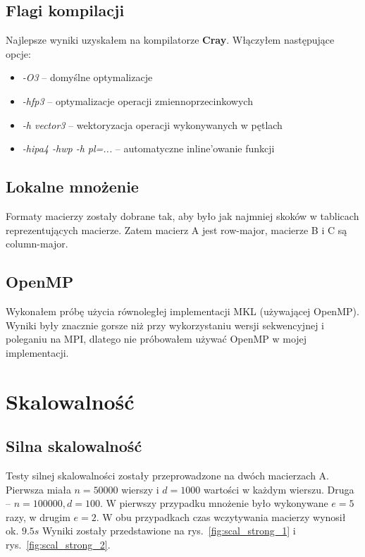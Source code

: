 \documentclass{article}
\begin{document}
\subsection{Flagi kompilacji}
Najlepsze wyniki uzyskałem na kompilatorze \textbf{Cray}. Włączyłem następujące opcje:
\begin{itemize}
  \item \emph{-O3} -- domyślne optymalizacje
  \item \emph{-hfp3} -- optymalizacje operacji zmiennoprzecinkowych
  \item \emph{-h vector3} -- wektoryzacja operacji wykonywanych w pętlach
  \item \emph{-hipa4 -hwp -h pl=...} -- automatyczne inline'owanie funkcji
\end{itemize}

\subsection{Lokalne mnożenie}
Formaty macierzy zostały dobrane tak, aby było jak najmniej skoków w tablicach reprezentujących macierze.
Zatem macierz A jest row-major, macierze B i C są column-major.

\subsection{OpenMP}
Wykonałem próbę użycia równoległej implementacji MKL (używającej OpenMP). Wyniki były znacznie gorsze niż przy
wykorzystaniu wersji sekwencyjnej i poleganiu na MPI, dlatego nie próbowałem używać OpenMP w mojej implementacji.

\section{Skalowalność}

\subsection{Silna skalowalność}

Testy silnej skalowalności zostały przeprowadzone na dwóch macierzach A. 
Pierwsza miała $n=50000$ wierszy i $d=1000$ wartości w każdym wierszu. Druga -- $n=100000, d=100$.
W pierwszy przypadku mnożenie było wykonywane $e=5$ razy, w drugim $e=2$.
W obu przypadkach czas wczytywania macierzy wynosił ok. $9.5s$
Wyniki zostały przedstawione na rys.~\ref{fig:scal_strong_1} i rys.~\ref{fig:scal_strong_2}.
\end{document}
